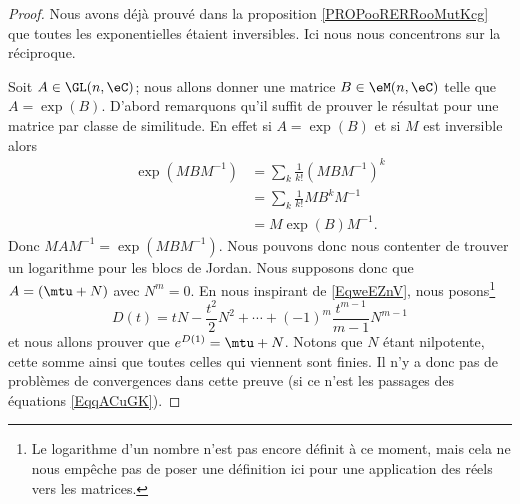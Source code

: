 \begin{proof}
    Nous avons déjà prouvé dans la proposition \ref{PROPooRERRooMutKcg} que toutes les exponentielles étaient inversibles. Ici nous nous concentrons sur la réciproque.

    Soit \( A\in \GL(n,\eC)\); nous allons donner une matrice \( B\in \eM(n,\eC)\) telle que \( A=\exp(B)\). D'abord remarquons qu'il suffit de prouver le résultat pour une matrice par classe de similitude. En effet si \( A=\exp(B)\) et si \( M\) est inversible alors
    \begin{subequations}    \label{EqqACuGK}
        \begin{align}
            \exp(MBM^{-1})&=\sum_k\frac{1}{ k! }(MBM^{-1})^k\\
            &=\sum_k\frac{1}{ k! }MB^kM^{-1}\\
            &=M\exp(B)M^{-1}.
        \end{align}
    \end{subequations}
    Donc \( MAM^{-1}=\exp(MBM^{-1})\). Nous pouvons donc nous contenter de trouver un logarithme pour les blocs de Jordan. Nous supposons donc que \( A=(\mtu+N)\) avec \( N^m=0\).
    En nous inspirant de \eqref{EqweEZnV}, nous posons\footnote{Le logarithme d'un nombre n'est pas encore définit à ce moment, mais cela ne nous empêche pas de poser une définition ici pour une application des réels vers les matrices.}
    \begin{equation}
        D(t)=tN-\frac{ t^2 }{ 2 }N^2+\cdots +(-1)^m\frac{ t^{m-1} }{ m-1 }N^{m-1}
    \end{equation}
    et nous allons prouver que \(  e^{D(1)}=\mtu+N\). Notons que \( N\) étant nilpotente, cette somme ainsi que toutes celles qui viennent sont finies. Il n'y a donc pas de problèmes de convergences dans cette preuve (si ce n'est les passages des équations \eqref{EqqACuGK}).


\end{proof}
